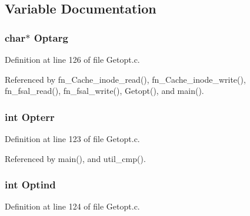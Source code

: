 \subsection{Variable Documentation}
\subsubsection{\setlength{\rightskip}{0pt plus 5cm}char$\ast$ {\bf Optarg}}\label{Getopt_8h_a3}




Definition at line 126 of file Getopt.c.

Referenced by fn\_\-Cache\_\-inode\_\-read(), fn\_\-Cache\_\-inode\_\-write(), fn\_\-fsal\_\-read(), fn\_\-fsal\_\-write(), Getopt(), and main().
\subsubsection{\setlength{\rightskip}{0pt plus 5cm}int {\bf Opterr}}\label{Getopt_8h_a0}




Definition at line 123 of file Getopt.c.

Referenced by main(), and util\_\-cmp().
\subsubsection{\setlength{\rightskip}{0pt plus 5cm}int {\bf Optind}}\label{Getopt_8h_a1}




Definition at line 124 of file Getopt.c.

